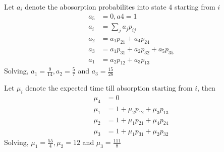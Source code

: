 \documentclass[../../probability-notes.tex]{subfile}
\begin{document}
        Let $a_{i}$ denote the abosorption probabilites into state $4$ starting from $i$
        \begin{align*}
            a_{5} &= 0, a{4} = 1 \\
            a_{i} &= \sum_{j} a_{j}p_{ij}\\
            a_{2} &= a_{1}p_{21} + a_{4}p_{24}\\
            a_{3} &= a_{1}p_{31} + a_{2}p_{32} + a_{5}p_{35}\\
            a_{1} &= a_{2}p_{12} + a_{3}p_{13}
        \end{align*}
        Solving, $a_{1} = \frac{9}{14}, a_{2} = \frac{5}{7}$ and $a_{3} = \frac{15}{28}$ \newline
        
        Let $\mu_{i}$ denote the expected time till absorption starting from $i$, then
        \begin{align*}
            \mu_{4} &= 0 \\
            \mu_{1} &= 1 + \mu_{2}p_{12} + \mu_{3}p_{13} \\
            \mu_{2} &= 1 + \mu_{1}p_{21} + \mu_{4}p_{24} \\
            \mu_{3} &= 1 + \mu_{1}p_{31} + \mu_{2}p_{32}
        \end{align*}
        Solving, $\mu_{1} = \frac{55}{4}, \mu_{2} = 12$ and $\mu_{3} = \frac{111}{8}$
\end{document}
